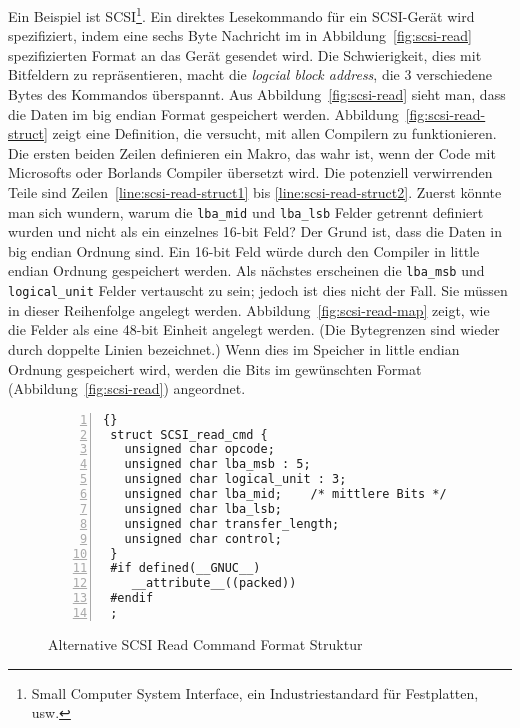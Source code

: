  Ein Beispiel ist SCSI\footnote{Small Computer System
Interface, ein Industriestandard f\"{u}r Festplatten, usw.}. Ein
direktes Lesekommando f\"{u}r ein SCSI-Ger\"{a}t wird spezifiziert, indem
eine sechs Byte Nachricht im in Abbildung~\ref{fig:scsi-read}
spezifizierten Format an das Ger\"{a}t gesendet wird. Die Schwierigkeit,
dies mit Bitfeldern zu repr\"{a}sentieren, macht die \emph{logcial block
address}, die 3 verschiedene Bytes des Kommandos \"{u}berspannt. Aus
Abbildung~\ref{fig:scsi-read} sieht man, dass die Daten im big
endian Format gespeichert werden.
Abbildung~\ref{fig:scsi-read-struct} zeigt eine Definition, die
versucht, mit allen Compilern zu funktionieren. Die ersten beiden
Zeilen definieren ein Makro, das wahr ist, wenn der Code mit
Microsofts  oder Borlands
 Compiler \"{u}bersetzt wird. Die potenziell
verwirrenden Teile sind Zeilen~\ref{line:scsi-read-struct1} bis
\ref{line:scsi-read-struct2}. Zuerst k\"{o}nnte man sich wundern, warum
die \lstinline|lba_mid| und \lstinline|lba_lsb| Felder getrennt
definiert wurden und nicht als ein einzelnes 16-bit Feld? Der Grund
ist, dass die Daten in big endian Ordnung sind. Ein 16-bit Feld
w\"{u}rde durch den Compiler in little endian Ordnung gespeichert
werden. Als n\"{a}chstes erscheinen die \lstinline|lba_msb| und
\lstinline|logical_unit| Felder vertauscht zu sein; jedoch ist dies
nicht der Fall. Sie m\"{u}ssen in dieser Reihenfolge angelegt werden.
Abbildung~\ref{fig:scsi-read-map} zeigt, wie die Felder als eine
48-bit Einheit angelegt werden. (Die Bytegrenzen sind wieder durch
doppelte Linien bezeichnet.) Wenn dies im Speicher in little endian
Ordnung gespeichert wird, werden die Bits im gew\"{u}nschten Format
(Abbildung~\ref{fig:scsi-read}) angeordnet.

\begin{figure}[t]
\begin{lstlisting}[frame=lrtb, numbers=left]{}
 struct SCSI_read_cmd {
   unsigned char opcode;
   unsigned char lba_msb : 5;
   unsigned char logical_unit : 3;
   unsigned char lba_mid;    /* mittlere Bits */
   unsigned char lba_lsb;
   unsigned char transfer_length;
   unsigned char control;
 }
 #if defined(__GNUC__)
    __attribute__((packed))
 #endif
 ;
\end{lstlisting}
\caption{Alternative SCSI Read Command Format Struktur
\label{fig:scsi-read-struct2} 
}
\end{figure}

